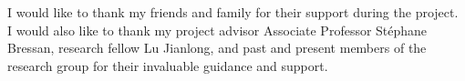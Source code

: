 \documentclass[fyp,12pt]{socreport}
\theoremstyle{definition}
\theoremstyle{plain}
\begin{document}
\begin{acknowledgement}
I would like to thank my friends and family for their support during the project. I would also like to thank my project advisor Associate Professor St\'ephane Bressan, research fellow Lu Jianlong, and past and present members of the research group for their invaluable guidance and support.
\end{acknowledgement}

\listoffigures %
\listoftables %
\tableofcontents












\appendix



\end{document}
